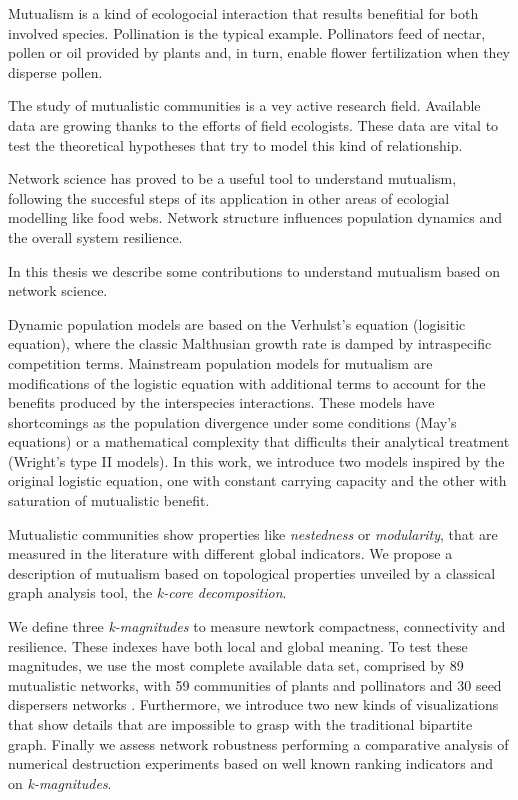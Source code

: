 \documentclass[
11pt, %
spanish, %
onehalfspacing, %
]{MastersDoctoralThesis_custom} %
\newcounter{theo}%
\begin{document}
\begin{declaration}
\addchaptertocentry{\authorshipname}

Mutualism is a kind of ecologocial interaction that results benefitial for both involved species. Pollination is the typical example. Pollinators feed of nectar, pollen or oil provided by plants and, in turn, enable flower fertilization when they disperse pollen.   

The study of mutualistic communities is a vey active research field. Available data are growing thanks to the efforts of field ecologists. These data are vital to test the theoretical hypotheses that try to model this kind of relationship.

Network science has proved to be a useful tool to understand mutualism, following the succesful steps of its application in other areas of ecologial modelling like food webs. Network structure influences population dynamics and the overall system resilience. 

In this thesis we describe some contributions to understand mutualism based on network science. 

Dynamic population models are based on the Verhulst’s equation (logisitic equation), where the classic Malthusian growth rate is damped by intraspecific competition terms. Mainstream population models for mutualism are modifications of the logistic equation with additional terms to account for the benefits produced by the interspecies interactions. These models have shortcomings as the population divergence under some conditions (May’s equations) or a mathematical complexity that difficults their analytical treatment
(Wright’s type II models). In this work, we introduce two models inspired by the original logistic equation, one with constant carrying capacity and the other with saturation of mutualistic benefit.

Mutualistic communities show properties like \textit{nestedness} or \textit{modularity}, that are measured in the literature with different global indicators. We propose a description of mutualism based on topological properties unveiled by a classical graph analysis tool, the \textit{k-core decomposition}.

We define three \textit{k-magnitudes} to measure newtork compactness, connectivity and resilience. These indexes have both local and global meaning. To test these magnitudes, we use the most complete
available data set, comprised by 89 mutualistic networks, with 59 communities of plants
and pollinators and 30 seed dispersers networks . Furthermore, we introduce two
new kinds of visualizations that show details that are impossible to grasp with
the traditional bipartite graph. Finally we assess network robustness performing a comparative analysis of numerical destruction experiments based on well known ranking indicators and on \textit{k-magnitudes}.

\end{declaration}
\end{document}

